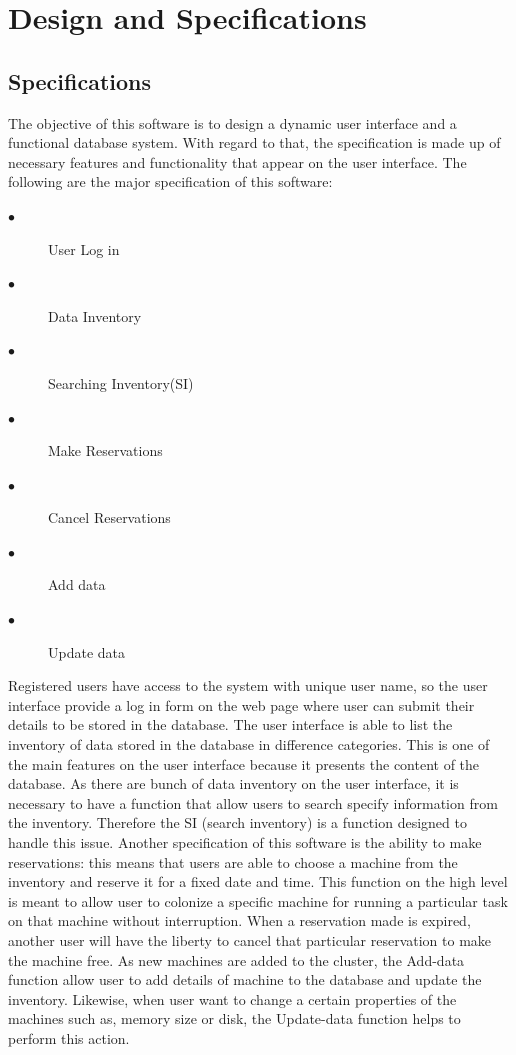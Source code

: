 \chapter{Design and Specifications}
\label{chap:figtab}
\label{chap}

\section{Specifications}

 The objective of this software is to design a dynamic user interface and a functional database system. With regard to that, the specification is made up of necessary features and functionality that appear on the user interface. The following are the major specification of this software:
\begin{description}
\item[$\bullet$] User Log in
\item[$\bullet$] Data Inventory
\item[$\bullet$] Searching Inventory(SI)
\item[$\bullet$] Make Reservations
\item[$\bullet$] Cancel Reservations
\item[$\bullet$] Add data
\item[$\bullet$] Update data
\end{description}
Registered users have access to the system with unique user name, so the user interface provide a log in form on the web page where user can submit their details to be stored in the database. The user interface is able to list the inventory of data stored in the database in difference categories. This is one of the main features on the user interface because it presents the content of the database. As there are bunch of data inventory on the user interface, it is necessary to have a function that allow users to search specify information from the inventory. Therefore the SI (search inventory) is a function designed to handle this issue. Another specification of this software is the ability to make reservations: this means that users are able to choose a machine from the inventory and reserve it for a fixed date and time. This function on the high level is meant to allow user to colonize a specific machine for running a particular task on that machine without interruption. When a reservation made is expired, another user will have the liberty to cancel that particular reservation to make the machine free. As new machines are added to the cluster, the Add-data function allow user to add details of machine to the database and update the inventory. Likewise, when user want to change a certain properties of the machines such as, memory size or disk, the Update-data function helps to perform this action.



